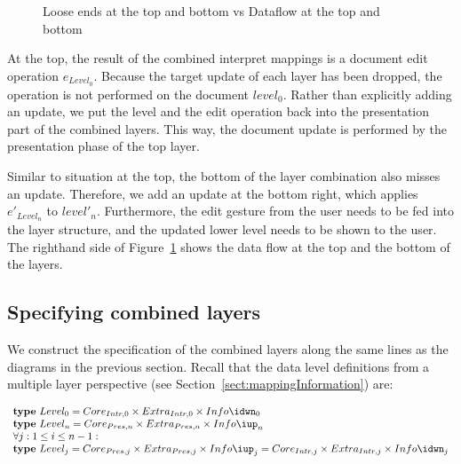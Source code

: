 \begin{figure}\begin{center}\begin{center}
\end{center}
\caption{Loose ends at the top and bottom vs Dataflow at the top and bottom}\label{topAndBottom} 
\end{center}\end{figure}


At the top, the result of the combined interpret mappings is a document edit operation $e_{Level_0}$. Because the target update of each layer has been dropped, the operation is not performed on the document $level_0$. Rather than explicitly adding an update, we put the level and the edit operation back into the presentation part of the combined layers. This way, the document update is performed by the presentation phase of the top layer.

Similar to situation at the top, the bottom of the layer combination also misses an update. Therefore, we add an update at the bottom right, which applies $e'_{Level_n}$ to $level'_n$. Furthermore, the edit gesture from the user needs to be fed into the layer structure, and the updated lower level needs to be shown to the user. The righthand side of Figure~\ref{topAndBottom} shows the data flow at the top and the bottom of the layers.

\subsection{Specifying combined layers}

We construct the specification of the combined layers along the same lines as the diagrams in the previous section. Recall that the data level definitions from a multiple layer perspective (see Section~\ref{sect:mappingInformation}) are:

\begin{small}\( \begin{array}{lcl}  \label{inv:incrementality}
\text{\bf type}~Level_{0}  =  Core_{Intr,0} \times Extra_{Intr,0} \times Info\idwn_{0} \\
\text{\bf type}~Level_{n}  =  Core_{Pres,n} \times Extra_{Pres,n} \times  Info\iup_{n}\\
\lefteqn{\forall j:1 \le i \le n-1:}  \\
\text{\bf type}~Level_{j} =  Core_{Pres,j} \times Extra_{Pres,j}  \times Info\iup_{j}   
                                       =  Core_{Intr,j} \times Extra_{Intr,j} \times Info\idwn_{j}
\end{array}\)\end{small}

